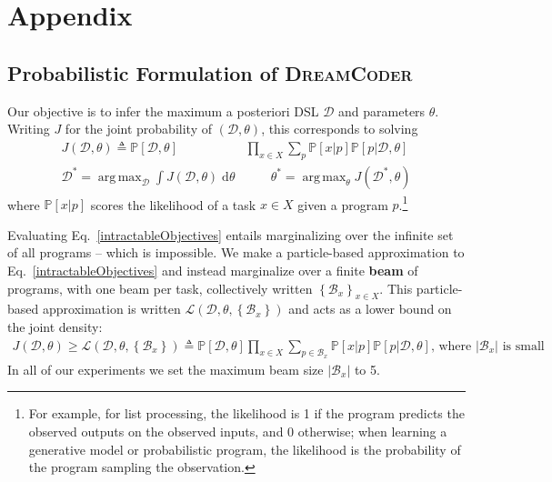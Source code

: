 \documentclass{article}
\newcommand{\system}{\textsc{DreamCoder}~}
\newcommand{\lowerBound}{\mathscr{L}}
\DeclareMathOperator*{\argmax}{arg\,max} %
\newcommand{\probability}{\mathds{P}} %
\begin{document}





\appendix

\section{Appendix}



\subsection{Probabilistic Formulation of \system}\label{probabilisticAppendix}
Our objective is to infer the maximum a posteriori DSL $\mathcal{D}$ and
parameters $\theta$. Writing $J$ for the joint probability of $(\mathcal{D},\theta)$,
this corresponds to solving
\begin{align}\label{intractableObjectives}
\nonumber  J(\mathcal{D},\theta)\triangleq \probability[\mathcal{D},\theta]&\prod_{x\in X} \sum_p \probability[x|p]\probability[p|\mathcal{D},\theta]\\
  \mathcal{D}^* = \argmax_{\mathcal{D}}\int J(\mathcal{D},\theta)\;\mathrm{d}\theta& \qquad
  \theta^* =\argmax_\theta J(\mathcal{D}^*,\theta)
\end{align}
where $\probability[x|p]$ scores the likelihood of a task
$x\in X$ given a program $p$.\footnote{For example, for list
  processing, the likelihood is 1 if the program predicts the observed
  outputs on the observed inputs, and 0 otherwise; when learning a
  generative model or probabilistic program, the likelihood is the
  probability of the program sampling the observation.}

Evaluating Eq.~\ref{intractableObjectives}
entails marginalizing over the infinite set of all programs -- which is impossible.
We make a particle-based approximation to Eq.~\ref{intractableObjectives}
and instead marginalize over a finite \textbf{beam} of programs,
with one beam per task, collectively written $\left\{\mathcal{B}_x \right\}_{x\in X}$.
This particle-based approximation is written $\lowerBound (\mathcal{D},\theta,\left\{\mathcal{B}_x \right\})$
and acts as a lower bound on the joint density:
\begin{align}
 J(\mathcal{D},\theta)\geq \lowerBound  (\mathcal{D},\theta,\left\{\mathcal{B}_x \right\})\triangleq\probability[\mathcal{D},\theta]\prod_{x\in X} \sum_{p\in \mathcal{B}_x} \probability[x|p]\probability[p|\mathcal{D},\theta]\text{, where $|\mathcal{B}_x|$ is small}
\end{align}
In all of our experiments we set the maximum beam size $|\mathcal{B}_x|$ to 5.
\end{document}
